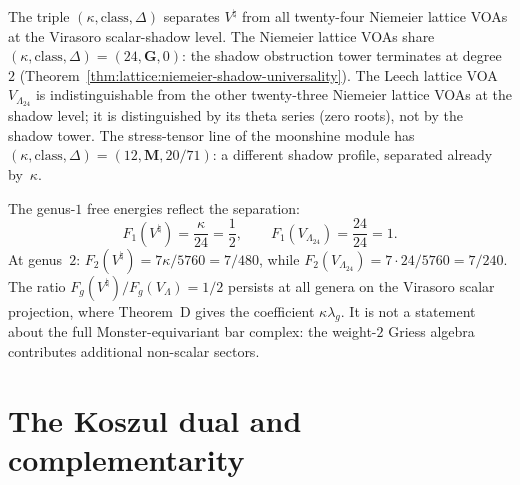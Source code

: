 \begin{remark}%
\label{rem:moonshine-niemeier-discrimination}%
%
%
The triple $(\kappa, \text{class}, \Delta)$ separates
$V^\natural$ from all twenty-four Niemeier lattice VOAs at the
Virasoro scalar-shadow level.
The Niemeier lattice VOAs share
$(\kappa, \text{class}, \Delta) = (24, \mathbf{G}, 0)$:
the shadow obstruction tower terminates at degree~$2$
(Theorem~\ref{thm:lattice:niemeier-shadow-universality}).
The Leech lattice VOA $V_{\Lambda_{24}}$ is
indistinguishable from the other twenty-three Niemeier lattice
VOAs at the shadow level; it is distinguished by its theta
series (zero roots), not by the shadow tower.
The stress-tensor line of the moonshine module has
$(\kappa, \text{class}, \Delta) = (12, \mathbf{M}, 20/71)$:
a different shadow profile, separated already by~$\kappa$.

The genus-$1$ free energies reflect the separation:
\begin{equation}\label{eq:moonshine-f1-comparison}
F_1(V^\natural) = \frac{\kappa}{24} = \frac{1}{2},
\qquad
F_1(V_{\Lambda_{24}}) = \frac{24}{24} = 1.
\end{equation}
At genus~$2$:
$F_2(V^\natural) = 7\kappa/5760 = 7/480$, while
$F_2(V_{\Lambda_{24}}) = 7 \cdot 24/5760 = 7/240$.
The ratio $F_g(V^\natural)/F_g(V_\Lambda) = 1/2$ persists
at all genera on the Virasoro scalar projection, where Theorem~D gives
the coefficient $\kappa\lambda_g$. It is not a statement about the
full Monster-equivariant bar complex: the weight-$2$ Griess algebra
contributes additional non-scalar sectors.
\end{remark}

\section{The Koszul dual and complementarity}

